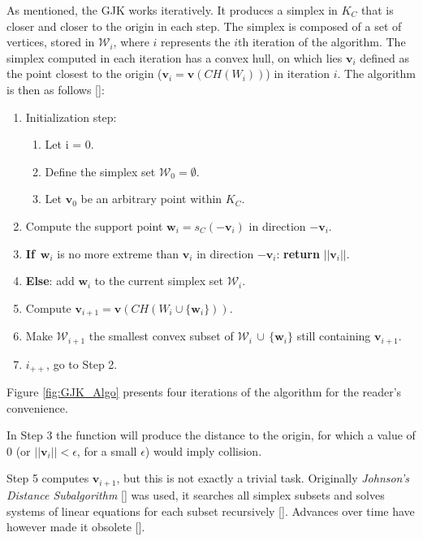 As mentioned, the \gls{GJK} works iteratively. It produces a simplex in $K_C$ that is closer and closer to the origin in each step. The simplex is composed of a set of vertices, stored in $\mathcal{W}_i$, where $i$ represents the $i$th iteration of the algorithm. The simplex computed in each iteration has a convex hull, on which lies $\textbf{v}_i$ defined as the point closest to the origin ($\textbf{v}_i = \textbf{v}(CH(W_i))$) in iteration $i$. The algorithm is then as follows [\citeauthor{Lindemann2009}]:

\begin{enumerate}
	\item Initialization step:
	\begin{enumerate}
		\item Let i = 0.
		\item Define the simplex set $\mathcal{W}_0 = \emptyset$.
		\item Let $\textbf{v}_0$ be an arbitrary point within $K_C$.
	\end{enumerate}
	\item Compute the support point $\textbf{w}_i = s_C(-\textbf{v}_i)$ in direction $-\textbf{v}_i$.
	\item \textbf{If} $\,\textbf{w}_i$ is no more extreme than $\textbf{v}_i$ in direction $-\textbf{v}_i$: \textbf{return} $||\textbf{v}_i||$.
	\item \textbf{Else}: add $\textbf{w}_i$ to the current simplex set $\mathcal{W}_i$.
	\item Compute $\textbf{v}_{i+1} = \textbf{v}(CH(W_i \cup \{\textbf{w}_i\}))$.
	\item Make $\mathcal{W}_{i+1}$ the smallest convex subset of  $\mathcal{W}_i\, \cup \, \{\textbf{w}_i\}$ still containing $\textbf{v}_{i+1}$.
	\item $i_{++}$, go to Step 2.
\end{enumerate}

Figure \ref{fig:GJK_Algo} presents four iterations of the algorithm for the reader's convenience.

In Step 3 the function will produce the distance to the origin, for which a value of 0 (or $||\textbf{v}_i|| < \epsilon$, for a small $\epsilon$) would imply collision.

Step 5 computes $\textbf{v}_{i+1}$, but this is not exactly a trivial task. Originally \textit{Johnson's Distance Subalgorithm} [\citeauthor{Gilbert1987}] was used, it searches all simplex subsets and solves systems of linear equations for each subset recursively [\citeauthor{Ericson2004}]. Advances over time have however made it obsolete [\citeauthor{Lindemann2009}].

